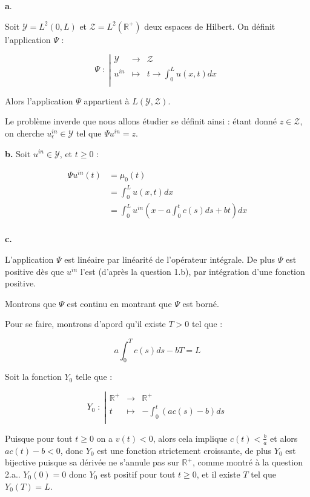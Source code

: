 \documentclass[a4paper]{article}
\newcommand{\Y}{\mathscr{Y}}
\newcommand{\Z}{\mathscr{Z}}
\begin{document}
\textbf{a}.

Soit $\Y = L^2(0,L)$ et $\Z = L^2(\mathbb{R}^+)$ deux espaces de Hilbert. 
On définit l'application $\Psi$ :

 \begin{equation}
	 \Psi \; : \; \left\vert
	\begin{array}{ccc}
	\Y & \to & \Z \\
	u^{in} & \mapsto & t \to \int_0^L u(x,t) dx\\
	\end{array} \right.
\end{equation}

Alors l'application $\Psi$ appartient à $L(\Y,\Z)$.

\begin{definition}
Le problème inverde que nous allons étudier se définit ainsi : 
étant donné $z \in \Z$, on cherche $u_{\epsilon}^{in} \in \Y$ 
tel que $\Psi u^{in} = z$.
\end{definition}

\textbf{b.}
Soit $u^{in} \in \Y$, et $t \geq 0$ :

\[ \begin{split}
\Psi u^{in}(t) &= \mu_0 (t) \\
               &= \int_0^L u(x,t) dx \\
			   &= \int_0^L u^{in}( x - a\int_0^tc(s)ds + bt) dx \\
\end{split}\]

\textbf{c.}

L'application $\Psi$ est linéaire par linéarité de l'opérateur intégrale.
De plus $\Psi $ est positive dès que $u^{in}$ l'est (d'après la question 1.b), par intégration d'une fonction positive.

Montrons que $\Psi$ est continu en montrant que $\Psi$ est borné.

Pour se faire, montrons d'apord qu'il existe $T>0$ tel que :

\[ a\int_0^Tc(s)ds - bT = L\]

Soit la fonction $Y_0$ telle que :

\[Y_0 \; : \; \left\vert
	\begin{array}{ccc}
	\mathbb{R}^+ & \to & \mathbb{R}^+\\
	t & \mapsto & -\int_0^t (ac(s)-b)ds \\
	\end{array} \right.
\]

Puisque pour tout $t \geq 0 $ on a $v(t)<0$,
alors cela implique $c(t)< \frac{b}{a}$ et alors $ac(t)-b<0$, donc $Y_0$ est une fonction strictement croissante, de plus $Y_0$ est bijective puisque sa dérivée ne s'annule pas sur $\mathbb{R}^+$, comme montré à la question 2.a..
$Y_0 (0) =0$ donc $Y_0$ est positif pour tout $t \geq 0$,
et il existe $T$ tel que $Y_0(T) = L$.
\end{document}
